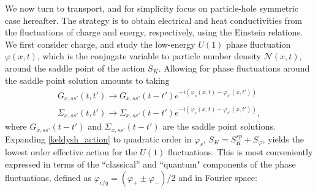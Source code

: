 \documentclass[twocolumn,floatfix,superscriptaddress]{revtex4-1}
\begin{document}
 
 We now turn to transport, and for simplicity focus on particle-hole symmetric case hereafter.  The strategy is to obtain electrical and heat conductivities from the fluctuations of charge and energy, respectively, using the Einstein relations.  We first consider charge, and study the low-energy $U(1)$ phase fluctuation $\varphi(x,t)$, which is the conjugate variable to particle number density $\mathcal N(x,t)$, around the saddle point of the action $S_K$.   Allowing for phase fluctuations around the saddle point solution amounts to taking
\begin{eqnarray}
\label{phi_var}
G_{x,ss'}(t,t')\rightarrow G_{x,ss'}(t-t')e^{-i(\varphi_s(x,t)-\varphi_{s'}(x,t'))}\nonumber\\
\Sigma_{x,ss'}(t,t')\rightarrow\Sigma_{x,ss'}(t-t')e^{-i(\varphi_s(x,t)-\varphi_{s'}(x,t'))},
\end{eqnarray}
where $G_{x,ss'}(t-t')$ and $\Sigma_{x,ss'}(t-t')$ are the saddle point solutions.
Expanding \eqref{keldysh_action} to quadratic order in $\varphi_s$, $S_K = S_K^{sp} + S_\varphi$, yields the lowest order effective action for the $U(1)$ fluctuations. This is most conveniently expressed in terms of the  ``classical'' and  ``quantum" components of the phase fluctuations, defined as $\varphi_{c/q}=(\varphi_+\pm \varphi_-)/2$ and in Fourier space:
\end{document}
